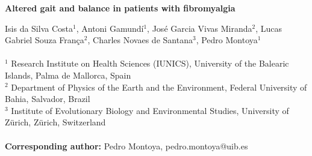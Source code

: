 \documentclass[12pt]{article}
\date{}
\begin{document}
\begin{flushleft}
\Large\textbf{Altered gait and balance in patients with fibromyalgia }\\\end{flushleft}
Isis da Silva Costa$^{1}$, Antoni Gamund\'i$^{1}$, Jos\'e Garcia Vivas Miranda$^{2}$, Lucas Gabriel Souza Fran\c{c}a$^{2}$, Charles Novaes de Santana$^{3}$, Pedro Montoya$^{1}$  
\\
\\
{\small $^{1}$ Research Institute on Health Sciences (IUNICS), University of the Balearic Islands, Palma de Mallorca, Spain
\\
$^{2}$ Department of Physics of the Earth and the Environment, Federal University of Bahia, Salvador, Brazil
\\
$^{3}$ Institute of Evolutionary Biology and Environmental Studies, University of Z\"urich, Z\"urich, Switzerland
\\
\\
\textbf{Corresponding author:} Pedro Montoya, pedro.montoya@uib.es }


\end{document}
